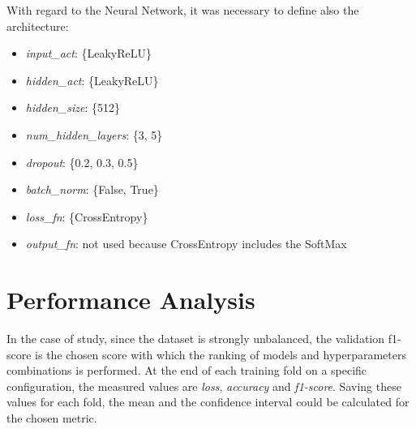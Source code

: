 \documentclass[../main]{subfiles}
\begin{document}
With regard to the Neural Network, it was necessary to define also the architecture:
\begin{itemize}
    \item \textit{input\_act}: \{LeakyReLU\}
    \item \textit{hidden\_act}: \{LeakyReLU\}
    \item \textit{hidden\_size}: \{512\}
    \item \textit{num\_hidden\_layers}: \{3, 5\}
    \item \textit{dropout}: \{0.2, 0.3, 0.5\}
    \item \textit{batch\_norm}: \{False, True\}
    \item \textit{loss\_fn}: \{CrossEntropy\}
    \item \textit{output\_fn}: not used because CrossEntropy includes the SoftMax
\end{itemize}

\section{Performance Analysis}
In the case of study, since the dataset is strongly unbalanced, the validation f1-score is the chosen score with which the ranking of models and hyperparameters combinations is performed.
At the end of each training fold on a specific configuration, the measured values are \textit{loss}, \textit{accuracy} and \textit{f1-score}.
Saving these values for each fold, the mean and the confidence interval could be calculated for the chosen metric.

\cleardoublepage
\end{document}
